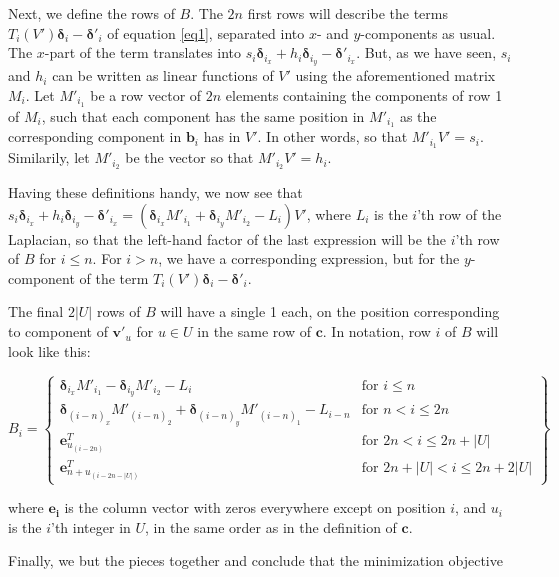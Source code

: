 \documentclass[english]{article}
\begin{document}
Next, we define the rows of $B$. The $2n$ first rows will describe the terms $T_i(V')\mathbf{\delta}_i - \mathbf{\delta'}_i$ of equation \ref{eq1}, separated into $x$- and $y$-components as usual. The $x$-part of the term translates into $s_i\mathbf{\delta}_{i_x} + h_i\mathbf{\delta}_{i_y} - \mathbf{\delta'}_{i_x}$. But, as we have seen, $s_i$ and $h_i$ can be written as linear functions of $V'$ using the aforementioned matrix $M_i$. Let $M'_{i_1}$ be a row vector of $2n$ elements containing the components of row 1 of $M_i$, such that each component has the same position in $M'_{i_1}$ as the corresponding component in $\mathbf{b}_i$ has in $V'$. In other words, so that $M'_{i_1}V' = s_i$. Similarily, let $M'_{i_2}$ be the vector so that $M'_{i_2}V' = h_i$.

Having these definitions handy, we now see that $s_i\mathbf{\delta}_{i_x} + h_i\mathbf{\delta}_{i_y} - \mathbf{\delta'}_{i_x} = (\mathbf{\delta}_{i_x}M'_{i_1} + \mathbf{\delta}_{i_y}M'_{i_2} - L_i)V'$, where $L_i$ is the $i$'th row of the Laplacian, so that the left-hand factor of the last expression will be the $i$'th row of $B$ for $i \leq n$. For $i > n$, we have a corresponding expression, but for the $y$-component of the term $T_i(V') \mathbf{\delta}_i - \mathbf{\delta'}_i$.

The final $2|U|$ rows of $B$ will have a single 1 each, on the position corresponding to component of $\mathbf{v'}_u$ for $u \in U$ in the same row of $\mathbf{c}$. In notation, row $i$ of $B$ will look like this:

\[
B_i = \left\{\begin{array}{lr}
\mathbf{\delta}_{i_x}M'_{i_1} - \mathbf{\delta}_{i_y}M'_{i_2} - L_i & \text{for } i \leq n \\
\mathbf{\delta}_{{(i-n)}_x}M'_{{(i-n)}_2} + \mathbf{\delta}_{{(i-n)}_y}M'_{{(i-n)}_1} - L_{i-n} & \text{for } n < i \leq 2n \\
\mathbf{e}^T_{u_{(i - 2n)}} & \text{for } 2n < i \leq 2n + |U| \\
\mathbf{e}^T_{n + u_{(i - 2n - |U|)}} & \text{for } 2n + |U| < i \leq 2n + 2|U|
\end{array}\right\}
\]

where $\mathbf{e_i}$ is the column vector with zeros everywhere except on position $i$, and $u_i$ is the $i$'th integer in $U$, in the same order as in the definition of $\mathbf{c}$.

Finally, we but the pieces together and conclude that the minimization objective
\end{document}
